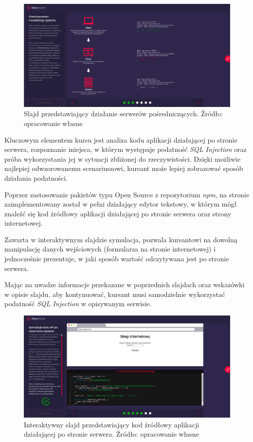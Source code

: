 \documentclass[12pt,twoside]{article}
\begin{document}
\begin{figure}[H]
	\centering
	\includegraphics[width=1\linewidth]{figures/sql-slide-screenshot3.png}
	\caption{Slajd przedstawiający działanie serwerów pośredniczących. Źródło: opracowanie własne}
	\label{Fig:Interaktywny slajd przedstawiający budowę omawianej strony}
\end{figure} 

Kluczowym elementem kursu jest analiza kodu aplikacji działającej po stronie serwera, rozpoznanie miejsca, w którym występuje podatność \emph{SQL Injection} oraz próba wykorzystania jej w sytuacji zbliżonej do rzeczywistości. Dzięki możliwie najlepiej odwzorowanemu scenariuszowi, kursant może lepiej zobrazować sposób działania podatności.

Poprzez zastosowanie pakietów typu Open Source z repozytorium \emph{npm}, na stronie zaimplementowany został w pełni działający edytor tekstowy, w którym mógł znaleźć się kod źródłowy aplikacji działającej po stronie serwera oraz strony internetowej. 

Zawarta w interaktywnym slajdzie symulacja, pozwala kursantowi na dowolną manipulację danych wejściowych (formularza na stronie internetowej) i jednocześnie prezentuje, w jaki sposób wartość odczytywana jest po stronie serwera. 

Mając na uwadze informacje przekazane w poprzednich slajdach oraz wskazówki w opisie slajdu, aby kontynuować, kursant musi samodzielnie wykorzystać podatność \emph{SQL Injection} w opisywanym serwisie.

 
 \begin{figure}[H]
 	\centering
 	\includegraphics[width=1\linewidth]{figures/sql-slide-screenshot2.png}
 	\caption{Interaktywny slajd przedstawiający kod źródłowy aplikacji działającej po stronie serwera.  Źródło: opracowanie własne}
 \end{figure} 
 
\end{document}
